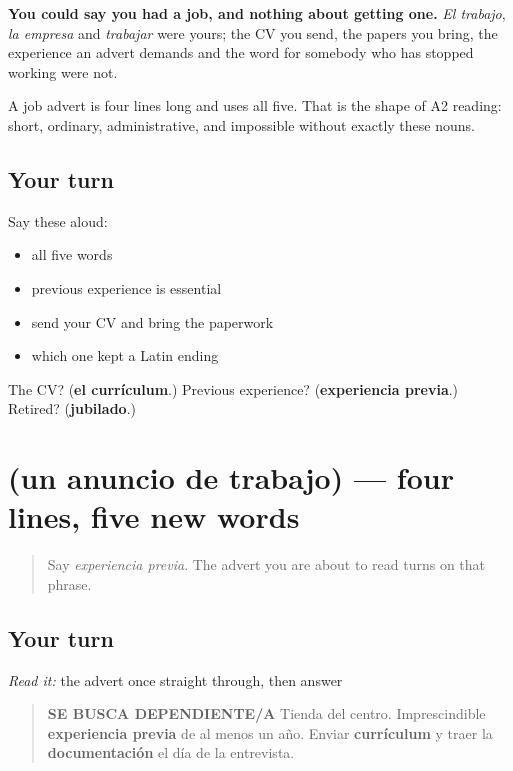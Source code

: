 \begin{grammarlens}[title={What you've built}]
\textbf{You could say you had a job, and nothing about getting one.} \emph{El trabajo}, \emph{la empresa} and \emph{trabajar} were yours; the CV you send, the papers you bring, the experience an advert demands and the word for somebody who has stopped working were not.

A job advert is four lines long and uses all five. That is the shape of A2 reading: short, ordinary, administrative, and impossible without exactly these nouns.
\end{grammarlens}

\subsection*{Your turn}
Say these aloud:

\begin{itemize}
\raggedright
  \item all five words
  \item previous experience is essential
  \item send your CV and bring the paperwork
  \item which one kept a Latin ending
\end{itemize}

\begin{tcolorbox}[breakable,colback=teal!4,colframe=teal!35!black,title={Before you move on}]
The CV? (\textbf{el currículum}.) Previous experience? (\textbf{experiencia previa}.) Retired? (\textbf{jubilado}.)
\end{tcolorbox}
\section[Practice]{(un anuncio de trabajo) — four lines, five new words}

\label{lesson:ES-C435-sintesis-anuncio}



\begin{quote}
Say \emph{experiencia previa}. The advert you are about to read turns on that phrase.
\end{quote}

\subsection*{Your turn}
\emph{Read it:} the advert once straight through, then answer

\begin{quote}
\textbf{SE BUSCA DEPENDIENTE/A} Tienda del centro. Imprescindible \textbf{experiencia previa} de al menos un año. Enviar \textbf{currículum} y traer la \textbf{documentación} el día de la entrevista.
\end{quote}

